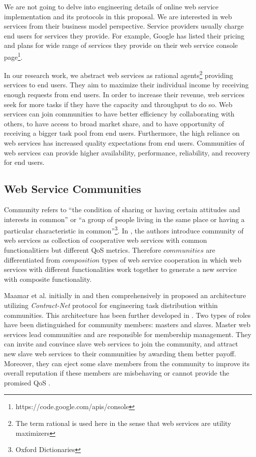 We are not going to delve into engineering details of online web
service implementation and its protocols in this proposal. We are
interested in web services from their business model perspective.
Service providers usually charge end users for services they
provide. For example, Google has listed their pricing and plans
for wide range of services they provide on their web service
console page\footnote{https://code.google.com/apis/console}.

In our research work, we abstract web services as rational
agents\footnote{The term
        rational is used here in the sense that web services are utility
        maximizers} providing services to end users. They aim to maximize
        their individual income by receiving enough requests from end
        users. In order to increase their revenue, web services seek for
        more tasks if they have the capacity and throughput to do so. Web
        services can join communities to have better efficiency by
        collaborating with others, to have access to broad market share,
        and to have opportunity of receiving a bigger task pool from end
        users. Furthermore, the high reliance on web services has increased quality expectations from end users.
        Communities of web services can provide higher availability, performance, reliability, and recovery for end users.

\subsection{Web Service Communities}\label{sec:CWSDefinition}
Community refers to ``the condition of sharing or having certain
attitudes and interests in common'' or ``a group of people living
in the same place or having a particular characteristic in
common''\footnote{Oxford Dictionaries}. In
\cite{DBLP:journals/internet/BenatallahSD03,
Zeng:2003:QDW:775152.775211}, the authors introduce community of
web services as collection of cooperative web services with common
functionalitiers but different QoS metrics. Therefore
$communities$ are differentiated from $composition$ types of web
service cooperation in which web services with different
functionalities work together to generate a new service with
composite functionality.


Maamar et al. initially in \cite{conf/webist/MaamarLBTS07} and
then comprehensively in \cite{DBLP:journals/ijebr/MaamarSTBB09}
proposed an architecture utilizing \emph{Contract-Net} protocol
for engineering task distribution within communities. This
architecture has been further developed in
\cite{conf/IEEEscc/BenharrefSBB11, conf/IEEEscc/KhosravifarBMMT10,
conf/aina/LimTM11, CSTintercommunity}. Two types of roles have
been distinguished for community members: masters and slaves.
Master web services lead communities and are responsible for
membership management. They can invite and convince slave web
services to join the community, and attract new slave web services
to their communities by awarding them better payoff. Moreover,
they can eject some slave members from the community to improve
its overall reputation if these members are misbehaving or cannot
provide the promised QoS \cite{DBLP:journals/ijebr/MaamarSTBB09}.

